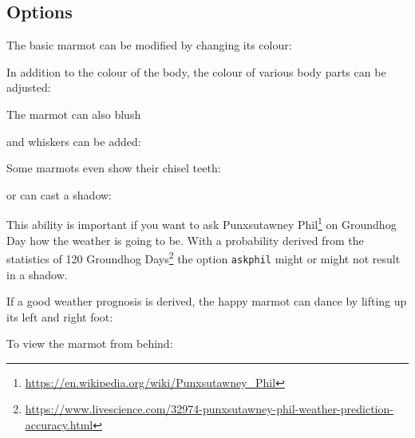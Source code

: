 \documentclass[parskip=half]{scrartcl}
\begin{document}
\subsection{Options}

The basic marmot can be modified by changing its colour:
\begin{tcblisting}{}
\marmot[body=blue]
\end{tcblisting}

In addition to the colour of the body, the colour of various body parts can be adjusted:
\begin{tcblisting}{}
\marmot[eye=red]
\end{tcblisting}
\begin{tcblisting}{}
\marmot[mouth=red]
\end{tcblisting}

The marmot can also blush
\begin{tcblisting}{}
\marmot[blush=red]
\end{tcblisting}

and whiskers can be added:
\begin{tcblisting}{}
\marmot[whiskers=gray]
\end{tcblisting}

Some marmots even show their chisel teeth:
\begin{tcblisting}{}
\marmot[teeth=white]
\end{tcblisting}

or can cast a shadow:
\begin{tcblisting}{}
\marmot[shadow]
\end{tcblisting}

This ability is important if you want to ask Punxsutawney Phil\footnote{\url{https://en.wikipedia.org/wiki/Punxsutawney_Phil}} on Groundhog Day how the weather is going to be. With a probability derived from the statistics of 120 Groundhog Days\footnote{\url{https://www.livescience.com/32974-punxsutawney-phil-weather-prediction-accuracy.html}} the option \lstinline|askphil| might or might not result in a shadow.
\begin{tcblisting}{}
\marmot[askphil]
\end{tcblisting}

If a good weather prognosis is derived, the happy marmot can dance by lifting up its left and right foot: 
\begin{tcblisting}{}
\marmot[leftstep]
\marmot[rightstep,xshift=2cm]
\end{tcblisting}

To view the marmot from behind:
\begin{tcblisting}{}
\marmot[back]
\end{tcblisting}
\end{document}

